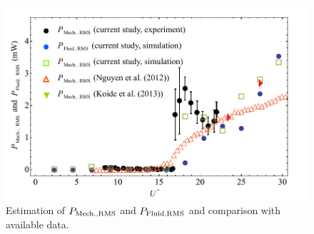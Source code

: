 \documentclass[oneside]{utmthesis}
\begin{document}
\begin{figure}
  \centering
  \includegraphics[width=1\textwidth]{figs/powerComparison}
  \caption{Estimation of $P_{\text{Mech.,RMS}}$ and $P_{\text{Fluid,RMS}}$ and comparison with available data.}
  \label{fig:powerComparison}
\end{figure}
\end{document}
